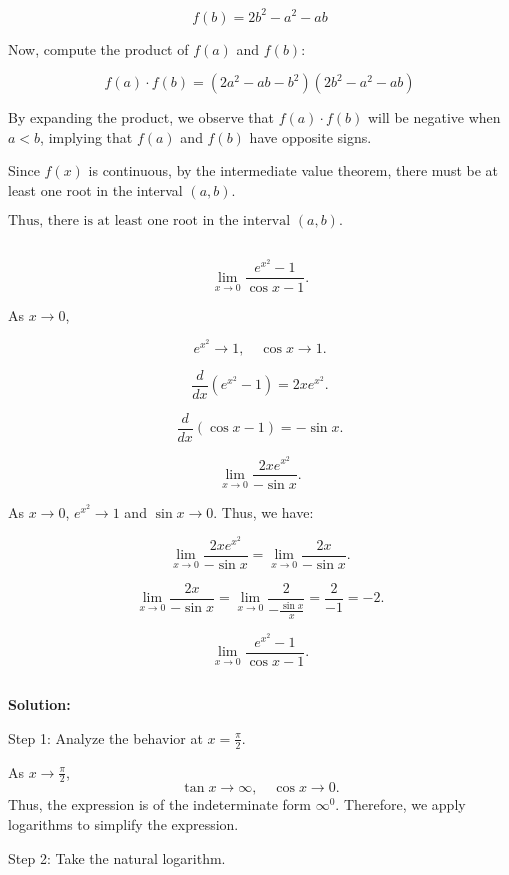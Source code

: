 \documentclass{article}
\begin{document}
	\[
	f(b) = 2b^2 - a^2 - ab
	\]
	
	Now, compute the product of \( f(a) \) and \( f(b) \):
	
	\[
	f(a) \cdot f(b) = (2a^2 - ab - b^2)(2b^2 - a^2 - ab)
	\]
	
	By expanding the product, we observe that \( f(a) \cdot f(b) \) will be negative when \( a < b \), implying that \( f(a) \) and \( f(b) \) have opposite signs. 
	
	Since \( f(x) \) is continuous, by the intermediate value theorem, there must be at least one root in the interval \( (a, b) \).
	
	\(\boxed{\text{Thus, there is at least one root in the interval } (a, b).}\)
	


\subsection{}
	\[
	\lim_{x \to 0} \frac{e^{x^2} - 1}{\cos x - 1}.
	\]

	
	As \( x \to 0 \), 
	
	\[
	e^{x^2} \to 1, \quad \cos x \to 1.
	\]
	
	
	\[
	\frac{d}{dx} (e^{x^2} - 1) = 2x e^{x^2}.
	\]
	
	
	\[
	\frac{d}{dx} (\cos x - 1) = -\sin x.
	\]
	
	
	\[
	\lim_{x \to 0} \frac{2x e^{x^2}}{-\sin x}.
	\]
	
	
	As \( x \to 0 \), \( e^{x^2} \to 1 \) and \( \sin x \to 0 \). Thus, we have:
	
	\[
	\lim_{x \to 0} \frac{2x e^{x^2}}{-\sin x} = \lim_{x \to 0} \frac{2x}{-\sin x}.
	\]
	
	
	\[
	\lim_{x \to 0} \frac{2x}{-\sin x} = \lim_{x \to 0} \frac{2}{-\frac{\sin x}{x}} = \frac{2}{-1} = -2.
	\]
	
	\[
\lim_{x \to 0} \frac{e^{x^2} - 1}{\cos x - 1}.
\]


\subsection{}	
\textbf{Solution:}

Step 1: Analyze the behavior at \( x = \frac{\pi}{2} \).

As \( x \to \frac{\pi}{2} \),
\[
\tan x \to \infty, \quad \cos x \to 0.
\]
Thus, the expression is of the indeterminate form \( \infty^0 \). Therefore, we apply logarithms to simplify the expression.

Step 2: Take the natural logarithm.
\end{document}
